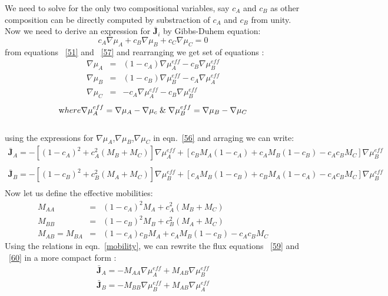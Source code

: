 \documentclass[12pt]{iiscthes}
\theoremstyle{definition}
\theoremstyle{definition}
\theoremstyle{remark}
\begin{document}
We need to solve for the only two compositional variables, say $ c_A$ and $c_B $ as other composition can be directly computed by substraction of $ c_A$ and $c_B $ from unity. Now we need to derive an expression for $ \mathbf{\bar J}_i $
by Gibbs-Duhem equation:
\begin{equation}\label{57}
c_A\nabla\mu_A +c_B\nabla\mu_B+c_C\nabla\mu_C = 0
\end{equation}
from equations ~\ref{51} and ~\ref{57}  and rearranging we get set of equations :
\begin{eqnarray}\label{58}
\nabla\mu_A &=& (1-c_A)\nabla\mu_A^{eff}-c_B\nabla\mu_B^{eff}\nonumber\\
\nabla\mu_B &=& (1-c_B)\nabla\mu_B^{eff}-c_A\nabla\mu_A^{eff}\nonumber\\
\nabla\mu_C &=& -c_A\nabla\mu_A^{eff}-c_B\nabla\mu_B^{eff}
\end{eqnarray}
\[ \mbox where{ \nabla\mu_A^{eff} = \nabla\mu_A-\nabla\mu_c\; \& \;\nabla\mu_B^{eff} =\nabla\mu_B-\nabla\mu_C }\]\\
using the expressions for $ \nabla\mu_A$,$ \nabla\mu_B$,$ \nabla\mu_C $ in eqn.~\ref{56} and arraging we can write:
\begin{eqnarray}\label{59}
\mathbf{\bar J}_A = -\left[\left(1-c_A\right)^2+c_A^2\left(M_B+M_C\right)\right]\nabla\mu_A^{eff}+\left[c_BM_A\left(1-c_A\right)+c_AM_B\left(1-c_B\right)-c_Ac_BM_C\right]\nabla\mu_B^{eff}\nonumber\\
\end{eqnarray}
\begin{eqnarray}\label{60}
\mathbf{\bar J}_B = -\left[\left(1-c_B\right)^2+c_B^2\left(M_A+M_C\right)\right]\nabla\mu_B^{eff}+\left[c_AM_B\left(1-c_B\right)+c_BM_A\left(1-c_A\right)-c_Ac_BM_C\right]\nabla\mu_B^{eff}\nonumber\\
\end{eqnarray}
Now let us define the effective mobilities:
\begin{eqnarray}\label{mobility}
M_{AA}&=&\left(1-c_A\right)^2M_A+c_A^2\left(M_B+M_C\right)\nonumber\\
M_{BB}&=&\left(1-c_B\right)^2M_B+c_B^2\left(M_A+M_C\right)\nonumber\\
M_{AB}=M_{BA}&=&\left(1-c_A\right)c_BM_A+c_AM_B\left(1-c_B\right)-c_Ac_BM_C
\end{eqnarray}
Using the relations in eqn.~\ref{mobility}, we can rewrite the flux equations ~\ref{59} and ~\ref{60} in a more compact form :
\begin{eqnarray}\label{61}
\mathbf{\bar J}_A = -M_{AA}\nabla\mu_A^{eff}+M_{AB}\nabla\mu_B^{eff}\nonumber\\
\mathbf{\bar J}_B = -M_{BB}\nabla\mu_B^{eff}+M_{AB}\nabla\mu_A^{eff}
\end{eqnarray}
\end{document}
